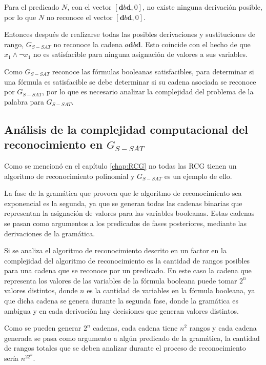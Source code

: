 \documentclass[12pt]{article}
\begin{document}
Para el predicado $N$, con el vector $[\mathbf{d}b\mathbf{d},0]$, no existe ninguna derivación posible, por lo que 
$N$ no reconoce el vector $[\mathbf{d}b\mathbf{d},0]$.

Entonces después de realizarse todas las posibles derivaciones y sustituciones de rango, $G_{S-SAT}$ no reconoce la cadena
$a\mathbf{d}b\mathbf{d}$. Esto coincide con el hecho de que $x_1 \wedge \neg x_1$ no es satisfacible para ninguna asignación de valores a sus variables.


Como $G_{S-SAT}$ reconoce las fórmulas booleanas satisfacibles, para determinar si una fórmula es satisfacible se debe determinar si su cadena asociada se reconoce por $G_{S-SAT}$, por lo que es necesario analizar la complejidad del problema de la palabra para $G_{S-SAT}$.

\subsection{Análisis de la complejidad computacional del reconocimiento en $G_{S-SAT}$}

Como se mencionó en el capítulo \ref{chap:RCG} no todas las RCG tienen un algoritmo de reconocimiento polinomial 
y $G_{S-SAT}$ es un ejemplo de ello.

La fase de la gramática que provoca que le algoritmo de reconocimiento sea exponencial es la segunda, ya que  se generan 
todas las cadenas binarias que representan la asignación de valores para las variables booleanas.
Estas cadenas se pasan como argumentos a los predicados de fases posteriores, mediante las derivaciones de la gramática.

Si se analiza el algoritmo de reconocimiento descrito en \cite{mainRCGBib} un factor en la complejidad del 
algoritmo de reconocimiento es la cantidad de rangos posibles para una cadena que se reconoce por un predicado. 
En este caso la cadena que representa los valores de las variables de la fórmula booleana puede tomar $2^n$
valores distintos, donde $n$ es la cantidad de variables en la fórmula booleana, ya que dicha cadena se genera 
durante la segunda fase, donde la gramática es ambigua y en cada derivación hay decisiones que generan valores 
distintos.

Como se pueden generar $2^n$ cadenas, cada cadena tiene $n^2$ rangos y cada cadena generada se pasa como 
argumento a algún predicado de la gramática, la cantidad de rangos totales que se deben analizar durante 
el proceso de reconocimiento sería $n^22^n$.
\end{document}
